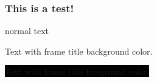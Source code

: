 \documentclass{beamer}
\begin{document}
    \begin{frame}
        \frametitle{This is a test!}


            normal text

            \textcolor{frametitle.bg}{Text with frame title background color.}

            \colorbox{black}{\textcolor{frametitle.fg}{Text with frame title foreground color.}}
    \end{frame}
\end{document}
